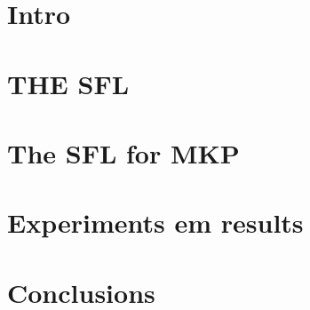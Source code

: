 \documentclass[10pt, conference, compsocconf]{IEEEtran}
\begin{document}
\section{Intro}

\section{THE SFL}
%

\section{The SFL for MKP}
\section{Experiments em results}
\section{Conclusions}

\printbibliography
\end{document}
